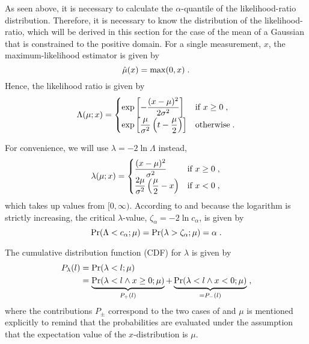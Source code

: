 \documentclass[a4paper]{article}
\newcommand*\Prob{\mathrm{Pr}}
\begin{document}
As seen above, it is necessary to calculate the $\alpha$-quantile of the
likelihood-ratio distribution. Therefore, it is necessary to know the
distribution of the likelihood-ratio, which will be derived in this
section for the case of the mean of a Gaussian that is constrained to
the positive domain. For a single measurement, $x$, the
maximum-likelihood estimator is given by\cite{Feldman1998}
%
\begin{equation*}
  \hat\mu(x) = \max(0, x)
  \;.
\end{equation*}
%
Hence, the likelihood ratio is given by
%
\begin{equation*}
  \Lambda(\mu; x) = 
  \begin{cases}
    \displaystyle
    \exp\left[ - \frac{(x-\mu)^2}{2\sigma^2} \right] & \text{if } x \geq 0
    \;,
    \\
    \displaystyle
    \exp\left[ \frac{\mu}{\sigma^2} \left( t - \frac{\mu}{2} \right) \right] & \text{otherwise}
    \;.
  \end{cases}
\end{equation*}
%

For convenience, we will use $\lambda=-2\ln\Lambda$ instead,
%
\begin{equation}
  \label{eq:log:likelihood:ratio}
  \lambda(\mu; x) = 
  \begin{cases}
    \displaystyle
     \frac{(x-\mu)^2}{\sigma^2} & \text{if } x \geq 0
    \;,
    \\
    \displaystyle
    \frac{2\mu}{\sigma^2} \left( \frac{\mu}{2} - x \right) & \text{if } x < 0
    \;,
  \end{cases}
\end{equation}
%
which takes up values from $[0, \infty)$.
According to  and because the
logarithm is strictly increasing,
the critical $\lambda$-value, $\zeta_\alpha = -2\ln c_\alpha$, is given by
%
\begin{equation*}
  \Prob(\Lambda < c_\alpha; \mu) = 
  \Prob(\lambda > \zeta_\alpha; \mu) = \alpha
  \fstop
\end{equation*}
%

The cumulative distribution function (CDF) for $\lambda$ is given by
\begin{align*}
  P_\lambda(l) & = \Prob(\lambda < l; \mu) \\
  & =
  \underbrace{\Prob(\lambda < l \wedge x \geq 0; \mu)}_{P_+(l)}
  +
  \underbrace{\Prob(\lambda < l \wedge x < 0; \mu)}_{=P_-(l)}
  \fcomma
\end{align*}
where the contributions $P_\pm$ correspond to the two cases of
 and $\mu$ is mentioned explicitly to
remind that the probabilities are evaluated under the assumption that
the expectation value of the $x$-distribution is $\mu$.
\end{document}
